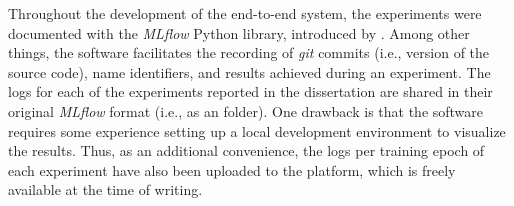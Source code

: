 
Throughout the development of the end-to-end system, the
experiments were documented with the \emph{MLflow} Python
library, introduced by \textcite{zaharia2018accelerating}.
Among other things, the software facilitates the recording
of \emph{git} commits
(i.e., version of the source code), name identifiers, and
results achieved during an experiment. The logs for each of
the experiments reported in the dissertation are shared in
their original \emph{MLflow} format (i.e., as an
 folder). One drawback is that the software
requires some experience setting up a local development
environment to visualize the results. Thus, as an additional
convenience, the logs per training epoch of each experiment
have also been uploaded to the
platform, which is
freely available at the time of writing.
